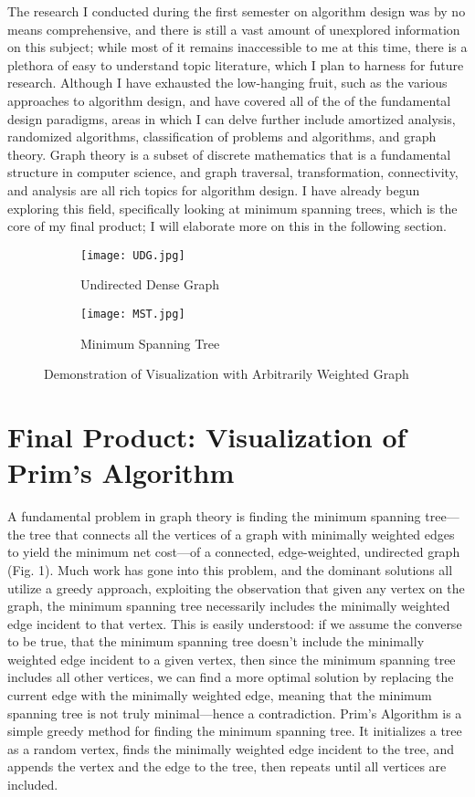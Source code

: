 \documentclass{article}
\begin{document}
The research I conducted during the first semester on algorithm design was by no means comprehensive, and there is still a vast amount of unexplored information on this subject; while most of it remains inaccessible to me at this time, there is a plethora of easy to understand topic literature, which I plan to harness for future research. Although I have exhausted the low-hanging fruit, such as the various approaches to algorithm design, and have covered all of the of the fundamental design paradigms, areas in which I can delve further include amortized analysis, randomized algorithms, classification of problems and algorithms, and graph theory. Graph theory is a subset of discrete mathematics that is a fundamental structure in computer science, and graph traversal, transformation, connectivity, and analysis are all rich topics for algorithm design. I have already begun exploring this field, specifically looking at minimum spanning trees, which is the core of my final product; I will elaborate more on this in the following section.

\begin{figure}
\centering
\begin{subfigure}{.5\textwidth}
  \centering
  \texttt{[image: UDG.jpg]}
  \caption{Undirected Dense Graph}
  \label{fig:sub1}
\end{subfigure}%
\begin{subfigure}{.5\textwidth}
  \centering
  \texttt{[image: MST.jpg]}
  \caption{Minimum Spanning Tree}
  \label{fig:sub2}
\end{subfigure}
\caption{Demonstration of Visualization with Arbitrarily Weighted Graph}
\label{fig:test}
\end{figure}


\section{Final Product: Visualization of Prim's Algorithm}

A fundamental problem in graph theory is finding the minimum spanning tree—the tree that connects all the vertices of a graph with minimally weighted edges to yield the minimum net cost—of a connected, edge-weighted, undirected graph (Fig. 1). Much work has gone into this problem, and the dominant solutions all utilize a greedy approach, exploiting the observation that given any vertex on the graph, the minimum spanning tree necessarily includes the minimally weighted edge incident to that vertex. This is easily understood: if we assume the converse to be true, that the minimum spanning tree doesn’t include the minimally weighted edge incident to a given vertex, then since the minimum spanning tree includes all other vertices, we can find a more optimal solution by replacing the current edge with the minimally weighted edge, meaning that the minimum spanning tree is not truly minimal—hence a contradiction. Prim’s Algorithm is a simple greedy method for finding the minimum spanning tree. It initializes a tree as a random vertex, finds the minimally weighted edge incident to the tree, and appends the vertex and the edge to the tree, then repeats until all vertices are included. 
\end{document}
